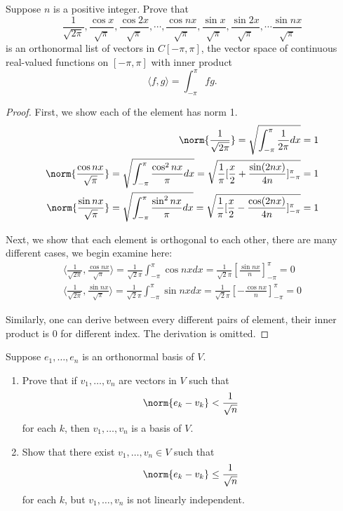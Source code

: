 \documentclass{extarticle}
\begin{document}
\begin{problem}{4}
    Suppose \(n\) is a positive integer. Prove that
    \[\frac{1}{\sqrt{2\pi}}, \frac{\cos x}{\sqrt{\pi}}, \frac{\cos 2x}{\sqrt{\pi}},
    \cdots, \frac{\cos n x}{\sqrt{\pi}}, \frac{\sin x}{\sqrt{\pi}}, \frac{\sin 2x}{\sqrt{\pi}}, \cdots
    \frac{\sin n x}{\sqrt{\pi}}\]
    is an orthonormal list of vectors in \(C[-\pi, \pi]\), the vector space of continuous real-valued functions on
    \([-\pi, \pi]\) with inner product
    \[\langle f,g \rangle = \int_{-\pi}^{\pi} fg.\]
\end{problem}

\begin{proof}
First, we show each of the element has norm 1.
\begin{align*}
    \norm{\frac{1}{\sqrt{2\pi}}}
    = \sqrt{ \int_{-\pi }^{\pi} \frac{1}{2 \pi} dx } = 1 \\
    \norm{\frac{\cos nx}{\sqrt{\pi}}}
    = \sqrt{\int_{-\pi }^{\pi} \frac{\cos^2 nx}{\pi} dx}
    = \sqrt{\frac{1}{\pi} [  \frac{x}{2} + \frac{\sin (2nx)}{4n}  ]_{-\pi}^\pi}
    =  1 \\
    \norm{\frac{\sin nx}{\sqrt{\pi}}}
    = \sqrt{\int_{-\pi }^{\pi} \frac{\sin^2 nx}{\pi} dx} =
    \sqrt{ \frac{1}{\pi} [  \frac{x}{2} - \frac{\cos (2nx)}{4n}  ]_{-\pi}^\pi  } = 1
\end{align*}

Next, we show that each element is orthogonal to each other, there are many different cases, we begin
examine here:
\begin{align*}
    \langle \frac{1}{\sqrt{2\pi}}, \frac{\cos nx}{\sqrt{\pi}} \rangle
    =  \frac{1}{\sqrt{2}\pi} \int_{-\pi}^{\pi} \cos nx dx = \frac{1}{\sqrt{2}\pi} [\frac{\sin nx}{n}]_{-\pi}^\pi
    =  0 \\
    \langle \frac{1}{\sqrt{2\pi}}, \frac{\sin nx}{\sqrt{\pi}} \rangle
    = \frac{1}{\sqrt{2} \pi} \int_{-\pi }^{\pi} \sin nx dx = \frac{1}{\sqrt{2}\pi} [-\frac{\cos nx}{n}]_{-\pi}^\pi
    = 0
\end{align*}

Similarly, one can derive between every different pairs of element, their inner product is 0 for different
index. The derivation is omitted.
\end{proof}

\begin{problem}{6}
    Suppose \(e_1, \ldots, e_n\) is an orthonormal basis of \(V\).
    \begin{enumerate}[label=(\alph*)]
        \item Prove that if \(v_1, \ldots, v_n\) are vectors in \(V\) such that
        \[\norm{e_k - v_k} < \frac{1}{\sqrt{n}}\]
        for each \(k\), then \(v_1, \ldots, v_n\) is a basis of \(V\).
        \item Show that there exist \(v_1, \ldots, v_n \in V\) such that
        \[\norm{e_k - v_k} \leq \frac{1}{\sqrt{n}}\]
        for each \(k\), but \(v_1, \ldots, v_n\) is not linearly independent.
    \end{enumerate}
\end{problem}
\end{document}
